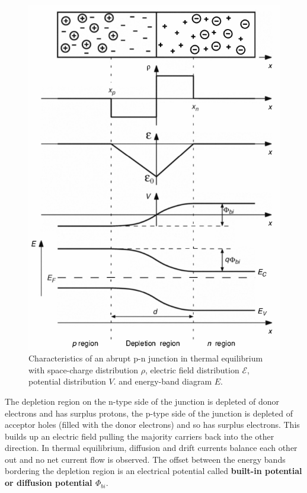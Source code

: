 \documentclass[main]{subfiles}
\begin{document}
\begin{figure}[H]
\centering
\includegraphics[scale=0.4]{figs/depletion_region.png}
\caption{Characteristics of an abrupt p-n junction in thermal equilibrium with space-charge distribution \(\rho\), electric field distribution \(\mathcal{E}\), potential distribution \(V\). and energy-band diagram \(E\)\cite{book:VLSI}.}
\end{figure}

The depletion region on the n-type side of the junction is depleted of donor electrons and has surplus protons, the p-type side of the junction is depleted of acceptor holes (filled with the donor electrons) and so has surplus electrons. This builds up an electric field pulling the majority carriers back into the other direction. In thermal equilibrium, diffusion and drift currents balance each other out and no net current flow is observed. The offset between the energy bands bordering the depletion region is an electrical potential called \textbf{built-in potential or diffusion potential \(\Phi_{bi}\)}.
\end{document}
